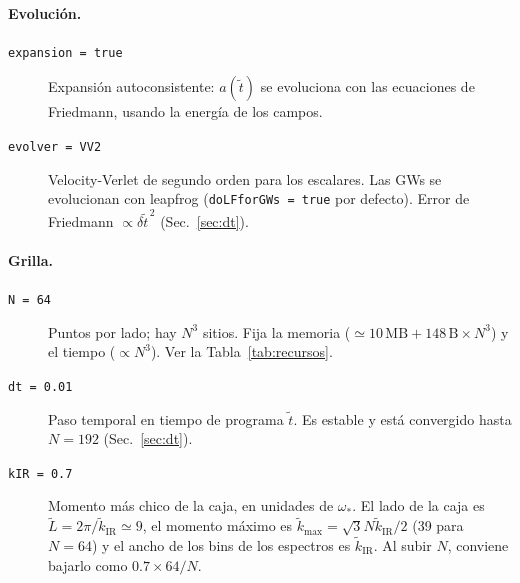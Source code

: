 \documentclass[11pt]{article}
\begin{document}
            \paragraph{Evolución.}
            \begin{description}
                \item[\texttt{expansion = true}] Expansión autoconsistente: $a(\tilde t)$ se evoluciona con las ecuaciones de Friedmann, usando la energía de los campos.
                \item[\texttt{evolver = VV2}] Velocity-Verlet de segundo orden para los escalares. Las GWs se evolucionan con leapfrog (\texttt{doLFforGWs = true} por defecto). Error de Friedmann $\propto \delta\tilde t^{\,2}$ (Sec.~\ref{sec:dt}).
            \end{description}

            \paragraph{Grilla.}
            \begin{description}
                \item[\texttt{N = 64}] Puntos por lado; hay $N^3$ sitios. Fija la memoria ($\simeq 10\,\text{MB} + 148\,\text{B} \times N^3$) y el tiempo ($\propto N^3$). Ver la Tabla~\ref{tab:recursos}.
                \item[\texttt{dt = 0.01}] Paso temporal en tiempo de programa $\tilde t$. Es estable y está convergido hasta $N = 192$ (Sec.~\ref{sec:dt}).
                \item[\texttt{kIR = 0.7}] Momento más chico de la caja, en unidades de $\omega_*$. El lado de la caja es $\tilde L = 2\pi/\tilde k_{\text{IR}} \simeq 9$, el momento máximo es $\tilde k_{\max} = \sqrt 3 N \tilde k_{\text{IR}}/2$ (39 para $N = 64$) y el ancho de los bins de los espectros es $\tilde k_{\text{IR}}$. Al subir $N$, conviene bajarlo como $0.7 \times 64/N$.
            \end{description}
\end{document}
